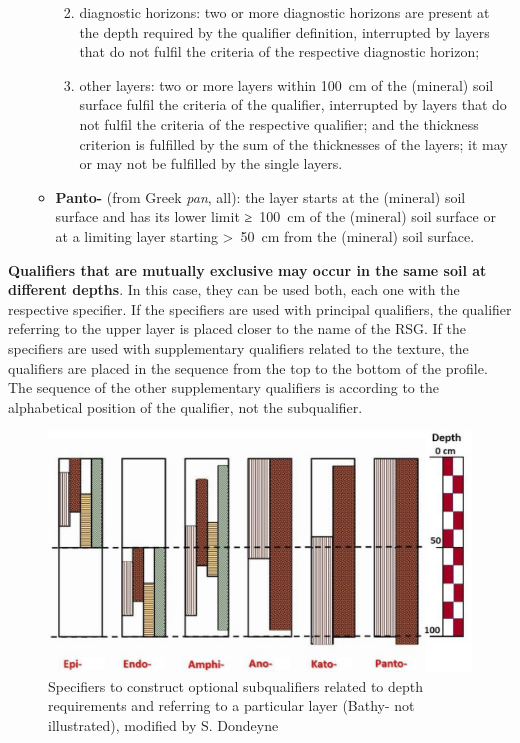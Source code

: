 \documentclass[
  letterpaper,
  DIV=11,
  numbers=noendperiod]{scrreprt}
\providecommand{\tightlist}{%
  \setlength{\itemsep}{0pt}\setlength{\parskip}{0pt}}\usepackage{longtable,booktabs,array}
\begin{document}
\begin{enumerate}
\begin{itemize}
    \begin{enumerate}
    \def\labelenumii{\alph{enumii}.}
    \tightlist
    \item
      diagnostic horizons: two or more diagnostic horizons are present
      at the depth required by the qualifier definition, interrupted by
      layers that do not fulfil the criteria of the respective
      diagnostic horizon;
    \item
      other layers: two or more layers within 100~cm of the (mineral)
      soil surface fulfil the criteria of the qualifier, interrupted by
      layers that do not fulfil the criteria of the respective
      qualifier; and the thickness criterion is fulfilled by the sum of
      the thicknesses of the layers; it may or may not be fulfilled by
      the single layers.
    \end{enumerate}
  \item
    \textbf{Panto-} (from Greek \emph{pan}, all): the layer starts at
    the (mineral) soil surface and has its lower limit ≥~100~cm of the
    (mineral) soil surface or at a limiting layer starting
    \textgreater~50~cm from the (mineral) soil surface.
  \end{itemize}
\end{enumerate}

\textbf{Qualifiers that are mutually exclusive may occur in the same
soil at different depths}. In this case, they can be used both, each one
with the respective specifier. If the specifiers are used with principal
qualifiers, the qualifier referring to the upper layer is placed closer
to the name of the RSG. If the specifiers are used with supplementary
qualifiers related to the texture, the qualifiers are placed in the
sequence from the top to the bottom of the profile. The sequence of the
other supplementary qualifiers is according to the alphabetical position
of the qualifier, not the subqualifier.

\begin{figure}

{\centering \includegraphics{./Figure_2-1.png}

}

\caption{Specifiers to construct optional subqualifiers related to depth
requirements and referring to a particular layer (Bathy- not
illustrated), modified by S. Dondeyne}

\end{figure}
\end{document}
